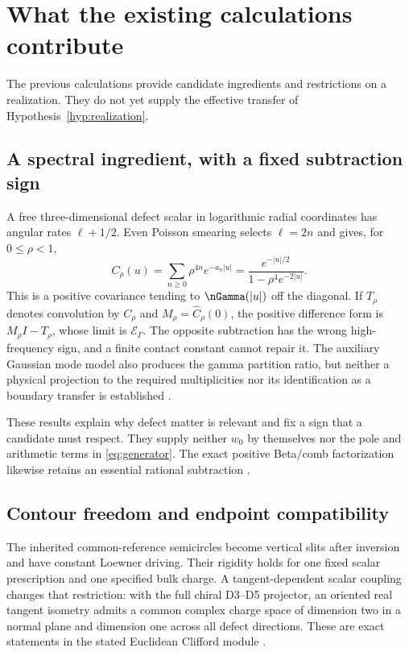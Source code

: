 \section{What the existing calculations contribute}\label{sec:constraints}

The previous calculations provide candidate ingredients and
restrictions on a realization. They do not yet supply the effective
transfer of Hypothesis~\ref{hyp:realization}.

\subsection{A spectral ingredient, with a fixed subtraction sign}

A free three-dimensional defect scalar in logarithmic radial
coordinates has angular rates $\ell+1/2$. Even Poisson smearing
selects $\ell=2n$ and gives, for $0\leq\rho<1$,
\begin{equation}
 C_\rho(u)=\sum_{n\geq0}\rho^{4n}e^{-a_n|u|}
       =\frac{e^{-|u|/2}}{1-\rho^4e^{-2|u|}}.
\end{equation}
This is a positive covariance tending to $\nGamma(|u|)$ off the
diagonal. If $T_\rho$ denotes convolution by $C_\rho$ and
$M_\rho=\widehat C_\rho(0)$, the positive difference form is
$M_\rho I-T_\rho$, whose limit is $\mathcal E_\Gamma$.
The opposite subtraction has the wrong high-frequency sign, and
a finite contact constant cannot repair it. The auxiliary Gaussian
mode model also produces the gamma partition ratio, but neither
a physical projection to the required multiplicities nor its
identification as a boundary transfer is established
\cite[Section~S2]{Supplement}.

These results explain why defect matter is relevant and fix a
sign that a candidate must respect. They supply neither $w_0$
by themselves nor the pole and arithmetic terms in
\eqref{eq:generator}. The exact positive Beta/comb factorization
likewise retains an essential rational subtraction
\cite[Section~S1.4]{Supplement}.

\subsection{Contour freedom and endpoint compatibility}

The inherited common-reference semicircles become vertical slits
after inversion and have constant Loewner driving. Their rigidity
holds for one fixed scalar prescription and one specified bulk
charge. A tangent-dependent scalar coupling changes that
restriction: with the full chiral D3--D5 projector, an oriented
real tangent isometry admits a common complex charge space of
dimension two in a normal plane and dimension one across all
defect directions. These are exact statements in the stated
Euclidean Clifford module
\cite[Sections~S3 and S5]{Supplement}.

